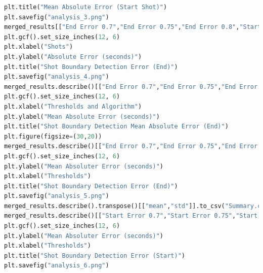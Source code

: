 \documentclass[12pt]{report}
\begin{document}
\begin{lstlisting}[language=Python,caption={Analysis Code}]
plt.title("Mean Absolute Error (Start Shot)")
plt.savefig("analysis_3.png")
merged_results[["End Error 0.7","End Error 0.75","End Error 0.8","Start Error 0.825","End Error 0.85","End Error 0.9","End Error Autoshot"]].plot(kind="line")
plt.gcf().set_size_inches(12, 6)
plt.xlabel("Shots")
plt.ylabel("Absolute Error (seconds)")
plt.title("Shot Boundary Detection Error (End)")
plt.savefig("analysis_4.png")
merged_results.describe()[["End Error 0.7","End Error 0.75","End Error 0.8","End Error 0.825","End Error 0.85","End Error 0.9"]].transpose()["mean"].plot()
plt.gcf().set_size_inches(12, 6)
plt.xlabel("Thresholds and Algorithm")
plt.ylabel("Mean Absolute Error (seconds)")
plt.title("Shot Boundary Detection Mean Absolute Error (End)")
plt.figure(figsize=(30,20))
merged_results.describe()[["End Error 0.7","End Error 0.75","End Error 0.8","End Error 0.825","End Error 0.85","End Error 0.9"]].transpose()["std"].plot()
plt.gcf().set_size_inches(12, 6)
plt.ylabel("Mean Absoluter Error (seconds)")
plt.xlabel("Thresholds")
plt.title("Shot Boundary Detection Error (End)")
plt.savefig("analysis_5.png")
merged_results.describe().transpose()[["mean","std"]].to_csv("Summary.csv")
merged_results.describe()[["Start Error 0.7","Start Error 0.75","Start Error 0.8","Start Error 0.825","Start Error 0.85","Start Error 0.9"]].transpose()["std"].plot()
plt.gcf().set_size_inches(12, 6)
plt.ylabel("Mean Absoluter Error (seconds)")
plt.xlabel("Thresholds")
plt.title("Shot Boundary Detection Error (Start)")
plt.savefig("analysis_6.png")
	   \end{lstlisting}
\end{document}
